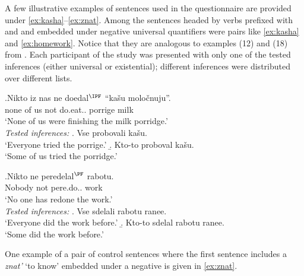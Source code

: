 A few illustrative examples of sentences used in the questionnaire are provided under \ref{ex:kasha}--\ref{ex:znat}. Among the sentences headed by verbs prefixed with  and  and embedded under negative universal quantifiers were pairs like \ref{ex:kasha} and \ref{ex:homework}. Notice that they are analogous to examples (12) and (18) from \citealt{Chemla:09}. Each participant  of the study was presented with only one of the tested inferences (either universal or existential); different inferences were distributed over different lists.

\exg.\label{ex:kasha}Nikto iz nas ne doedal$^{\IPF}$ ``ka\v{s}u molo\v{c}nuju''.\\
none of us not do.eat.. porrige milk\\
\trans `None of us were finishing the milk porridge.'\smallskip\\
\textit{Tested inferences:}
\a. Vse probovali ka\v{s}u.\\
`Everyone tried the porrige.'
\b. Kto-to proboval ka\v{s}u.\\
`Some of us tried the porridge.'


\exg.\label{ex:homework}Nikto ne peredelal$^{\PF}$ rabotu.\\
Nobody not pere.do.. work\\
\trans `No one has redone the work.'\smallskip\\
\textit{Tested inferences:}
\a. \label{test:homework1}Vse sdelali rabotu ranee.\\
`Everyone did the work before.'
\b. \label{test:homework2}Kto-to sdelal rabotu ranee.\\
`Some did the work before.'


One example of a pair of control sentences where the first sentence includes a  \textit{znat'} `to know' embedded under a negative  is given in \ref{ex:znat}.\largerpage[2]

